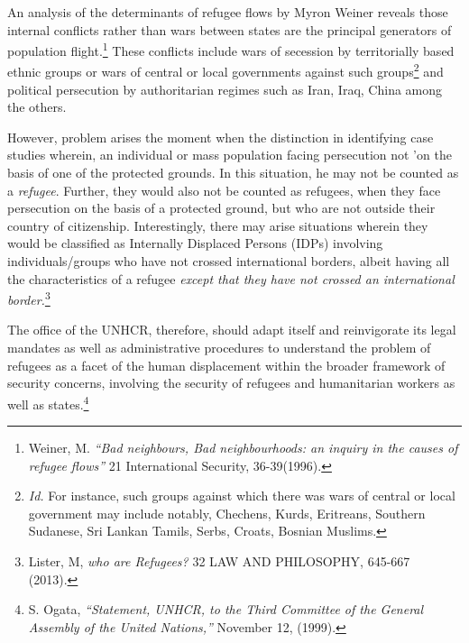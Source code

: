 \begin{multicols}{2}
\vspace{-.15cm}

\noi
An analysis of the determinants of refugee flows by Myron Weiner reveals those internal
conflicts rather than wars between states are the principal generators of population
flight.\footnote{Weiner, M. \textit{“Bad neighbours, Bad neighbourhoods: an inquiry in the causes of refugee flows”} 21
International Security, 36-39(1996).} These conflicts include wars of secession by territorially based ethnic groups or wars
of central or local governments against such groups\footnote{\textit{Id.} For instance, such groups against which there was wars of central or local government may include notably, Chechens, Kurds, Eritreans, Southern Sudanese, Sri Lankan Tamils, Serbs, Croats, Bosnian Muslims. } and political persecution by authoritarian regimes such as Iran, Iraq, China among the others.

\vspace{-.15cm}

\noi
However, problem arises the moment when the distinction in identifying case studies wherein,
an individual or mass population facing persecution not 'on the basis of one of the protected
grounds. In this situation, he may not be counted as a \textit{refugee}. Further, they would also not be
counted as refugees, when they face persecution on the basis of a protected ground, but who
are not outside their country of citizenship. Interestingly, there may arise situations wherein
they would be classified as Internally Displaced Persons (IDPs) involving individuals/groups
who have not crossed international borders, albeit having all the characteristics of a refugee
\textit{except that they have not crossed an international border.}\footnote{Lister, M, \textit{who are Refugees?} 32 LAW AND PHILOSOPHY, 645-667 (2013).}

\vspace{-.15cm}

\noi
The office of the UNHCR, therefore, should adapt itself and reinvigorate its legal mandates as
well as administrative procedures to understand the problem of refugees as a facet of the
human displacement within the broader framework of security concerns, involving the
security of refugees and humanitarian workers as well as states.\footnote{S. Ogata, \textit{“Statement, UNHCR, to the Third Committee of the General Assembly of the United Nations,”} November 12, (1999).}

\vspace{-.15cm}


\end{multicols}
